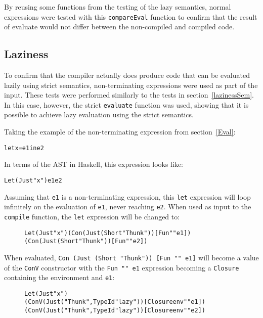 \noindent By reusing some functions from the testing of the lazy semantics,
normal expressions were tested with this \texttt{compareEval}
function to confirm that the result of evaluate would not differ between the
non-compiled and compiled code.

\subsection{Laziness}

To confirm that the compiler actually does produce code that can be evaluated
lazily using strict semantics, non-terminating expressions were used as part
of the input. These tests were performed similarly to the tests in
section~\ref{lazinessSem}. In this case, however, the strict \texttt{evaluate}
function was used, showing that it is possible to achieve lazy evaluation
using the strict semantics.

Taking the example of the non-terminating expression from section~\ref{Eval}:
\begin{alltt}
  let x = e1 in e2
\end{alltt}
In terms of the AST in Haskell, this expression looks like:
\begin{alltt}
  Let (Just "x") e1 e2
\end{alltt}
Assuming that \texttt{e1} is a non-terminating expression, this \texttt{let}
expression will loop infinitely on the evaluation of \texttt{e1}, never reaching
\texttt{e2}. When used as input to the \texttt{compile} function, the
\texttt{let} expression will be changed to:
\begin{figure}[!ht]
\begin{alltt}
  Let (Just "x") (Con (Just (Short "Thunk")) [Fun "" e1])
                 (Con (Just (Short "Thunk")) [Fun "" e2])
\end{alltt}
\end{figure}

\noindent When evaluated, \texttt{Con (Just (Short "Thunk")) [Fun "" e1]} will
become a value of the \texttt{ConV} constructor with the \texttt{Fun "" e1}
expression becoming a \texttt{Closure} containing the environment and
\texttt{e1}:
\begin{figure}[!ht]
\begin{alltt}
  Let (Just "x")
    (ConV (Just ("Thunk",TypeId "lazy")) [Closure env "" e1])
    (ConV (Just ("Thunk",TypeId "lazy")) [Closure env "" e2])
\end{alltt}
\end{figure}

